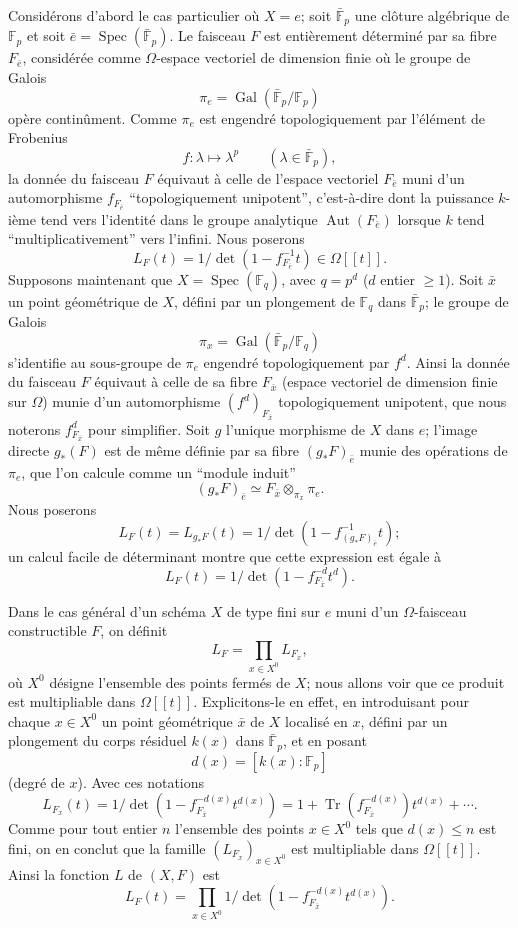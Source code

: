 \documentclass[11pt]{article}
\DeclareMathOperator{\Spec}{Spec}
\providecommand{\Gal}{\operatorname{Gal}}
\providecommand{\Tr}{\operatorname{Tr}}
\providecommand{\Tr}{\operatorname{Tr}}
\providecommand{\Tr}{\operatorname{Tr}}
\providecommand{\Aut}{\operatorname{Aut}}
\providecommand{\Tr}{\operatorname{Tr}}
\providecommand{\Spec}{\operatorname{Spec}}
\providecommand{\Spec}{\operatorname{Spec}}
\providecommand{\Aut}{\operatorname{Aut}}
\providecommand{\Spec}{\operatorname{Spec}}
\providecommand{\Tr}{\operatorname{Tr}}
\providecommand{\Spec}{\operatorname{Spec}}
\providecommand{\Gal}{\operatorname{Gal}}
\begin{document}
Considérons d'abord le cas particulier où $X=e$; soit $\bar{\mathbb F}_p$ une clôture algébrique de $\mathbb F_p$ et soit $\bar e=\Spec(\bar{\mathbb F}_p)$. Le faisceau $F$ est entièrement déterminé par sa fibre $F_{\bar e}$, considérée comme $\Omega$-espace vectoriel de dimension finie où le groupe de Galois
\[
\pi_e=\Gal(\bar{\mathbb F}_p/\mathbb F_p)
\]
opère continûment. Comme $\pi_e$ est engendré topologiquement par l'élément de Frobenius
\[
f: \lambda\longmapsto \lambda^p\qquad(\lambda\in\bar{\mathbb F}_p),
\]
la donnée du faisceau $F$ équivaut à celle de l'espace vectoriel $F_{\bar e}$ muni d'un automorphisme $f_{F_{\bar e}}$ ``topologiquement unipotent'', c'est-à-dire dont la puissance $k$-ième tend vers l'identité dans le groupe analytique $\Aut(F_{\bar e})$ lorsque $k$ tend ``multiplicativement'' vers l'infini. Nous poserons
\[
L_F(t)=1/\det(1-f_{F_{\bar e}}^{-1}t)\in\Omega[[t]].
\]
Supposons maintenant que $X=\Spec(\mathbb F_q)$, avec $q=p^d$ ($d$ entier $\ge1$). Soit $\bar x$ un point géométrique de $X$, défini par un plongement de $\mathbb F_q$ dans $\bar{\mathbb F}_p$; le groupe de Galois
\[
\pi_x=\Gal(\bar{\mathbb F}_p/\mathbb F_q)
\]
s'identifie au sous-groupe de $\pi_e$ engendré topologiquement par $f^d$. Ainsi la donnée du faisceau $F$ équivaut à celle de sa fibre $F_{\bar x}$ (espace vectoriel de dimension finie sur $\Omega$) munie d'un automorphisme $(f^d)_{F_{\bar x}}$ topologiquement unipotent, que nous noterons $f^d_{F_{\bar x}}$ pour simplifier. Soit $g$ l'unique morphisme de $X$ dans $e$; l'image directe $g_*(F)$ est de même définie par sa fibre $(g_*F)_{\bar e}$ munie des opérations de $\pi_e$, que l'on calcule comme un ``module induit''
\[
(g_*F)_{\bar e}\simeq F_{\bar x}\otimes_{\pi_x}\pi_e.
\]
Nous poserons
\[
L_F(t)=L_{g_*F}(t)=1/\det(1-f^{-1}_{(g_*F)_{\bar e}}t);
\]
un calcul facile de déterminant montre que cette expression est égale à
\[
L_F(t)=1/\det(1-f^{-d}_{F_{\bar x}}t^d).
\]

Dans le cas général d'un schéma $X$ de type fini sur $e$ muni d'un $\Omega$-faisceau constructible $F$, on définit
\[
L_F=\prod_{x\in X^0}L_{F_x},
\]
où $X^0$ désigne l'ensemble des points fermés de $X$; nous allons voir que ce produit est multipliable dans $\Omega[[t]]$. Explicitons-le en effet, en introduisant pour chaque $x\in X^0$ un point géométrique $\bar x$ de $X$ localisé en $x$, défini par un plongement du corps résiduel $k(x)$ dans $\bar{\mathbb F}_p$, et en posant
\[
d(x)=[k(x):\mathbb F_p]
\]
(degré de $x$). Avec ces notations
\[
L_{F_x}(t)=1/\det(1-f_{F_{\bar x}}^{-d(x)}t^{d(x)})
 =1+\Tr(f_{F_{\bar x}}^{-d(x)})t^{d(x)}+\cdots .
\]
Comme pour tout entier $n$ l'ensemble des points $x\in X^0$ tels que $d(x)\le n$ est fini, on en conclut que la famille $(L_{F_x})_{x\in X^0}$ est multipliable dans $\Omega[[t]]$. Ainsi la fonction $L$ de $(X,F)$ est
\[
L_F(t)=\prod_{x\in X^0}1/\det(1-f_{F_{\bar x}}^{-d(x)}t^{d(x)}).
\]
\end{document}
